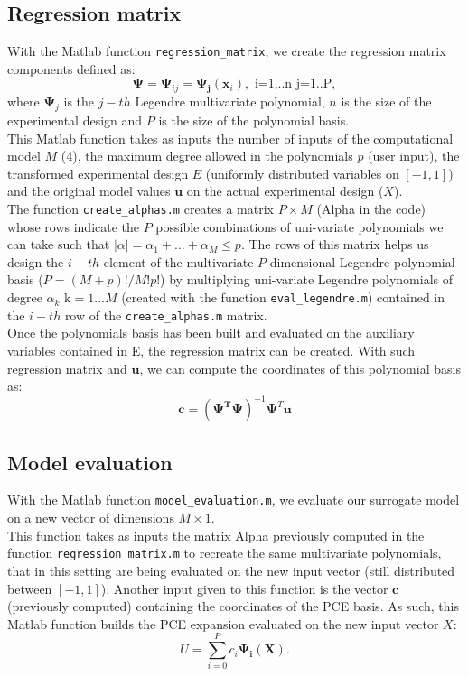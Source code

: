 \documentclass[a4paper,12pt]{article} %
\begin{document}
\subsection{Regression matrix}
With the Matlab function \texttt{regression\_matrix}, we create the regression matrix components defined as:
$$ \mathbf{\Psi}=\mathbf{\Psi}_{ij}=\mathbf{\Psi_j}(\mathbf{x}_i),\mbox{ i=1,..n j=1..P}, $$
where $\mathbf{\Psi}_j$ is the $j-th$ Legendre multivariate polynomial, $n$ is the size of the experimental design and $P$ is the size of the polynomial basis. 
\\
This Matlab function takes as inputs the number of inputs of the computational model $M$ (4), the maximum degree allowed in the polynomials $p$ (user input), the transformed experimental design $E$ (uniformly distributed variables on $[-1,1]$) and the original model values $\mathbf{u}$ on the actual experimental design ($X$).
\\
The function \texttt{create\_alphas.m} creates a matrix $P\times M$ (Alpha in the code) whose rows indicate the $P$ possible combinations of uni-variate polynomials we can take such that $\left| \alpha \right|= \alpha_1+ \hdots + \alpha_M \leq p$. The rows of this matrix helps us design the $i-th$ element of the multivariate $P$-dimensional Legendre polynomial basis ($P=(M+p)!/M!p!$) by multiplying uni-variate Legendre polynomials of degree $\alpha_k \mbox{ k}=1 \hdots M$ (created with the function \texttt{eval\_legendre.m}) contained in the $i-th$ row of the \texttt{create\_alphas.m} matrix. 
\\
Once the polynomials basis has been built and evaluated on the auxiliary variables contained in E, the regression matrix can be created. With such regression matrix and $\mathbf{u}$, we can compute the coordinates of this polynomial basis as:
$$ \mathbf{c} = \left ( \mathbf{\Psi^{T} \Psi} \right )^{-1} \mathbf{\Psi}^{T} \mathbf{u} $$ 
\subsection{Model evaluation}
With the Matlab function \texttt{model\_evaluation.m}, we evaluate our surrogate model on a new vector of dimensions $M \times 1$. 
\\
This function takes as inputs the matrix Alpha previously computed in the function \texttt{regression\_matrix.m} to recreate the same multivariate polynomials, that in this setting are being evaluated on the new input vector (still distributed between $[-1,1]$). Another input given to this function is the vector $\mathbf{c}$ (previously computed) containing the coordinates of the PCE basis. As such, this Matlab function builds the PCE expansion evaluated on the new input vector $X$: 
$$ U=\sum_{i=0}^P c_i \mathbf{\Psi_{i}}(\mathbf{X}). $$
\end{document}
